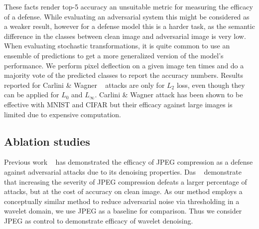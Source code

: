 These facts render top-5 accuracy an unsuitable metric for measuring the efficacy of a defense.
While evaluating an adversarial system this might be considered as a weaker result, however for a defense model this is a harder task, as the semantic difference in the classes between clean image and adversarial image is very low.
When evaluating stochastic transformations, it is quite common to use an ensemble of predictions to get a more generalized version of the model's performance.
We perform pixel deflection on a given image ten times and do a majority vote of the predicted classes to report the accuracy numbers. 
Results reported for Carlini \& Wagner ~\cite{Carlini2017TowardsET} attacks are only for $L_2$ loss, even though they can be applied for $L_0$ and $L_\infty$. 
Carlini \& Wagner attack has been shown to be effective with MNIST and CIFAR but their efficacy against large images is limited due to expensive computation. 


\subsection{Ablation studies}

Previous work ~\cite{Kurakin2016AdversarialEI,Dziugaite2016ASO} has demonstrated the efficacy of JPEG compression as a defense against adversarial attacks due to its denoising properties.
Das \etal ~\cite{Das2017KeepingTB} demonstrate that increasing the severity of JPEG compression defeats a larger percentage of attacks, but at the cost of accuracy on clean image.
As our method employs a conceptually similar method to reduce adversarial noise via thresholding in a wavelet domain, we use JPEG as a baseline for comparison.
Thus we consider JPEG as control to demonstrate efficacy of wavelet denoising.

